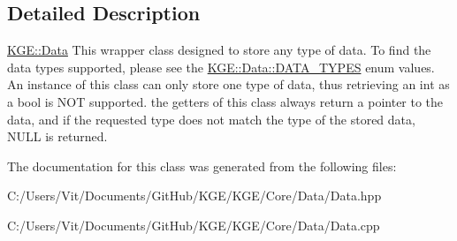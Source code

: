 \subsection{Detailed Description}
\hyperlink{class_k_g_e_1_1_data}{K\-G\-E\-::\-Data} This wrapper class designed to store any type of data. To find the data types supported, please see the \hyperlink{class_k_g_e_1_1_data_acc872a3e856e6d9b554d36d9f534308f}{K\-G\-E\-::\-Data\-::\-D\-A\-T\-A\-\_\-\-T\-Y\-P\-E\-S} enum values. An instance of this class can only store one type of data, thus retrieving an int as a bool is N\-O\-T supported. the getters of this class always return a pointer to the data, and if the requested type does not match the type of the stored data, N\-U\-L\-L is returned. 

The documentation for this class was generated from the following files\-:\begin{DoxyCompactItemize}
\item 
C\-:/\-Users/\-Vit/\-Documents/\-Git\-Hub/\-K\-G\-E/\-K\-G\-E/\-Core/\-Data/Data.\-hpp\item 
C\-:/\-Users/\-Vit/\-Documents/\-Git\-Hub/\-K\-G\-E/\-K\-G\-E/\-Core/\-Data/Data.\-cpp\end{DoxyCompactItemize}
